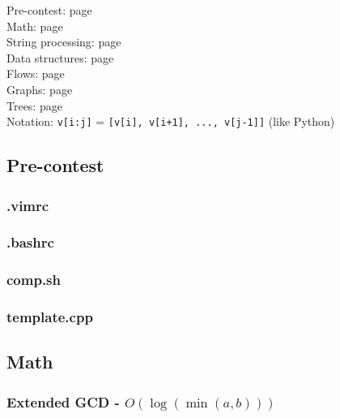 \documentclass[landscape,a4paper,twocolumn,10pt]{report}
\begin{document}
\footnotesize

\noindent
Pre-contest: page \pageref{precontest} \\
Math: page \pageref{math} \\
String processing: page \pageref{string} \\
Data structures: page \pageref{datastruct} \\
Flows: page \pageref{flows} \\
Graphs: page \pageref{graphs} \\
Trees: page \pageref{trees} \\

\noindent
Notation: \verb#v[i:j]# = \verb#[v[i], v[i+1], ..., v[j-1]]# (like Python)

\subsection*{Pre-contest}
\label{precontest}

\subsubsection{.vimrc}


\subsubsection*{.bashrc}


\subsubsection*{comp.sh}


\subsubsection{template.cpp}




\subsection*{Math}
\label{math}

\subsubsection{Extended GCD - $O(\log(\min(a, b)))$}

\end{document}
